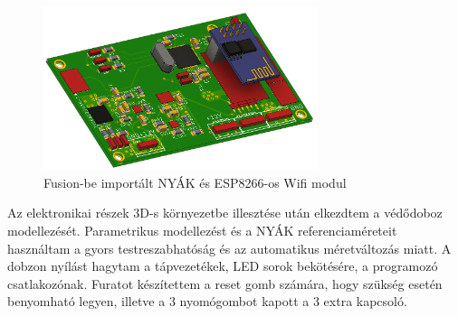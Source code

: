 \documentclass[../main.tex]{subfiles}
\begin{document}
            \begin{figure}[h!]
                    \centering
                        \includegraphics[width=8cm]{resources/pcb_res/fusion_pcb_esp8266.png}
                    \caption{Fusion-be importált NYÁK és ESP8266-os Wifi modul}
                    \label{fig:fusion_pcb_esp8266}
            \end{figure}
            
            Az elektronikai részek 3D-s környezetbe illesztése után elkezdtem a védődoboz modellezését. Parametrikus modellezést és a NYÁK referenciaméreteit használtam a gyors testreszabhatóság és az automatikus méretváltozás miatt. A dobzon nyílást hagytam a tápvezetékek, LED sorok bekötésére, a programozó csatlakozónak. Furatot készítettem a reset gomb számára, hogy szükség esetén benyomható legyen, illetve a 3 nyomógombot kapott a 3 extra kapcsoló.
            
            
\end{document}
